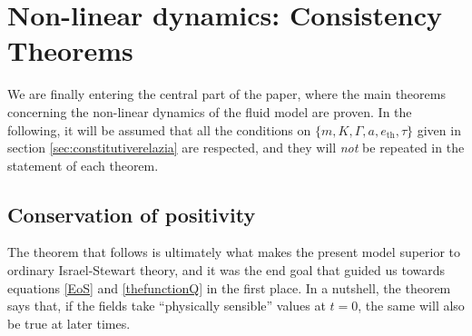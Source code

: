 \documentclass[a4paper, amsfonts, amssymb, amsmath, reprint, showkeys, nofootinbib, twoside,notitlepage,onecolumn]{revtex4-2}
\newcommand{\s}{{\mathfrak{s}}}
\theoremstyle{definition}
\theoremstyle{theorem}
\theoremstyle{corollary}
\begin{document}
\section{Non-linear dynamics: Consistency Theorems}

We are finally entering the central part of the paper, where the main theorems concerning the non-linear dynamics of the fluid model are proven. In the following, it will be assumed that all the conditions on $\{m,K,\Gamma,a,e_\text{th},\tau \}$ given in section \ref{sec:constitutiverelazia} are respected, and they will \textit{not} be repeated in the statement of each theorem.


\subsection{Conservation of positivity}

The theorem that follows is ultimately what makes the present model superior to ordinary Israel-Stewart theory, and it was the end goal that guided us towards equations \eqref{EoS} and \eqref{thefunctionQ} in the first place. In a nutshell, the theorem says that, if the fields take ``physically sensible'' values at $t=0$, the same will also be true at later times. 

\end{document}
